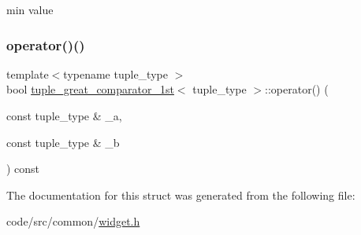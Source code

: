 min value 

\mbox{\label{structtuple__great__comparator__1st_ab62e5503d2af02a4f2383b54217659bb}} 
\subsubsection{\texorpdfstring{operator()()}{operator()()}}
{\footnotesize\ttfamily template$<$typename tuple\+\_\+type $>$ \\
bool \hyperlink{structtuple__great__comparator__1st}{tuple\+\_\+great\+\_\+comparator\+\_\+1st}$<$ tuple\+\_\+type $>$\+::operator() (\begin{DoxyParamCaption}\item[{const tuple\+\_\+type \&}]{\+\_\+a,  }\item[{const tuple\+\_\+type \&}]{\+\_\+b }\end{DoxyParamCaption}) const\hspace{0.3cm}{\ttfamily [inline]}}



The documentation for this struct was generated from the following file\+:\begin{DoxyCompactItemize}
\item 
code/src/common/\hyperlink{widget_8h}{widget.\+h}\end{DoxyCompactItemize}
